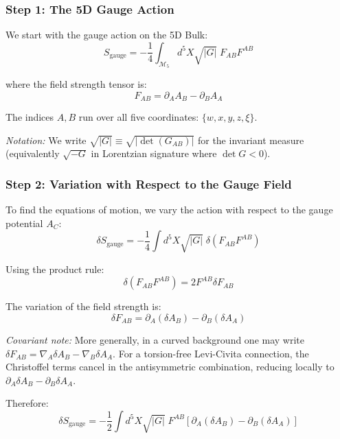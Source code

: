 \subsubsection{Step 1: The 5D Gauge Action}

We start with the gauge action on the 5D Bulk:
\begin{equation}
S_{\text{gauge}} = -\frac{1}{4}\int_{\mathcal{M}_5} d^5X \sqrt{|G|} \; F_{AB}F^{AB}
\end{equation}

where the field strength tensor is:
\begin{equation}
F_{AB} = \partial_A A_B - \partial_B A_A
\end{equation}

The indices $A, B$ run over all five coordinates: $\{w, x, y, z, \xi\}$.

\noindent\textit{Notation:} We write $\sqrt{|G|} \equiv \sqrt{|\det(G_{AB})|}$ for the invariant measure (equivalently $\sqrt{-G}$ in Lorentzian signature where $\det G < 0$).

\subsubsection{Step 2: Variation with Respect to the Gauge Field}

To find the equations of motion, we vary the action with respect to the gauge potential $A_C$:
\begin{equation}
\delta S_{\text{gauge}} = -\frac{1}{4}\int d^5X \sqrt{|G|} \; \delta(F_{AB}F^{AB})
\end{equation}

Using the product rule:
\begin{equation}
\delta(F_{AB}F^{AB}) = 2F^{AB}\delta F_{AB}
\end{equation}

The variation of the field strength is:
\begin{equation}
\delta F_{AB} = \partial_A (\delta A_B) - \partial_B (\delta A_A)
\end{equation}

\noindent\textit{Covariant note:} More generally, in a curved background one may write $\delta F_{AB} = \nabla_A \delta A_B - \nabla_B \delta A_A$. For a torsion-free Levi-Civita connection, the Christoffel terms cancel in the antisymmetric combination, reducing locally to $\partial_A \delta A_B - \partial_B \delta A_A$.

Therefore:
\begin{equation}
\delta S_{\text{gauge}} = -\frac{1}{2}\int d^5X \sqrt{|G|} \; F^{AB}\left[\partial_A (\delta A_B) - \partial_B (\delta A_A)\right]
\end{equation}

